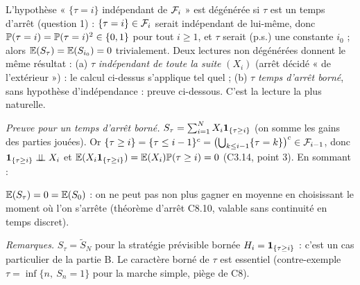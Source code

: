 \documentclass[11pt,a4paper]{article}
\begin{document}
\begin{exo}
\begin{alerte}
L'hypothèse « $\{\tau=i\}$ indépendant de $\mathcal{F}_i$ » est dégénérée si $\tau$ est un temps d'arrêt (question 1) : $\{\tau=i\}\in\mathcal{F}_i$
serait indépendant de lui-même, donc $\mathbb{P}(\tau=i)=\mathbb{P}(\tau=i)^2\in\{0,1\}$ pour tout $i\ge1$, et $\tau$ serait (p.s.) une constante
$i_0$ ; alors $\mathbb{E}(S_\tau)=\mathbb{E}(S_{i_0})=0$ trivialement.
Deux lectures non dégénérées donnent le même résultat :
(a) $\tau$ \emph{indépendant de toute la suite} $(X_i)$ (arrêt décidé « de l'extérieur ») : le calcul ci-dessus s'applique tel quel ;
(b) $\tau$ \emph{temps d'arrêt borné}, sans hypothèse d'indépendance : preuve ci-dessous. C'est la lecture la plus naturelle.
\end{alerte}

\emph{Preuve pour un temps d'arrêt borné.} $S_\tau=\sum_{i=1}^{N}X_i\mathbf{1}_{\{\tau\ge i\}}$ (on somme les gains des parties jouées). Or
$\{\tau\ge i\}=\{\tau\le i-1\}^c=\bigl(\bigcup_{k\le i-1}\{\tau=k\}\bigr)^c\in\mathcal{F}_{i-1}$, donc $\mathbf{1}_{\{\tau\ge i\}}\perp\!\!\!\perp X_i$ et
$\mathbb{E}(X_i\mathbf{1}_{\{\tau\ge i\}})=\mathbb{E}(X_i)\mathbb{P}(\tau\ge i)=0$ (C3.14, point 3). En sommant :
\begin{resultat}$\mathbb{E}(S_\tau)=0=\mathbb{E}(S_0)$ : on ne peut pas non plus gagner en moyenne en choisissant le moment où l'on s'arrête
(théorème d'arrêt C8.10, valable sans continuité en temps discret).\end{resultat}
\textit{Remarques.} $S_\tau=\tilde S_N$ pour la stratégie prévisible bornée $H_i=\mathbf{1}_{\{\tau\ge i\}}$ : c'est un cas particulier de la
partie B. Le caractère borné de $\tau$ est essentiel (contre-exemple $\tau=\inf\{n,\ S_n=1\}$ pour la marche simple, piège de C8).
\end{exo}
\end{document}
